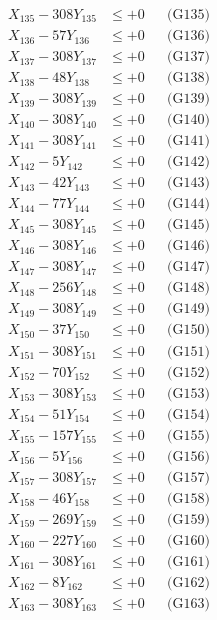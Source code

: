 \documentclass[a4paper,10pt]{article}
\begin{document}
{\begin{align}
X_{135} - 308Y_{135} &\leq +0 && \text{(G135)} \\
X_{136} - 57Y_{136} &\leq +0 && \text{(G136)} \\
X_{137} - 308Y_{137} &\leq +0 && \text{(G137)} \\
X_{138} - 48Y_{138} &\leq +0 && \text{(G138)} \\
X_{139} - 308Y_{139} &\leq +0 && \text{(G139)} \\
X_{140} - 308Y_{140} &\leq +0 && \text{(G140)} \\
\allowbreak
X_{141} - 308Y_{141} &\leq +0 && \text{(G141)} \\
X_{142} - 5Y_{142} &\leq +0 && \text{(G142)} \\
X_{143} - 42Y_{143} &\leq +0 && \text{(G143)} \\
X_{144} - 77Y_{144} &\leq +0 && \text{(G144)} \\
X_{145} - 308Y_{145} &\leq +0 && \text{(G145)} \\
X_{146} - 308Y_{146} &\leq +0 && \text{(G146)} \\
X_{147} - 308Y_{147} &\leq +0 && \text{(G147)} \\
X_{148} - 256Y_{148} &\leq +0 && \text{(G148)} \\
X_{149} - 308Y_{149} &\leq +0 && \text{(G149)} \\
X_{150} - 37Y_{150} &\leq +0 && \text{(G150)} \\
\allowbreak
X_{151} - 308Y_{151} &\leq +0 && \text{(G151)} \\
X_{152} - 70Y_{152} &\leq +0 && \text{(G152)} \\
X_{153} - 308Y_{153} &\leq +0 && \text{(G153)} \\
X_{154} - 51Y_{154} &\leq +0 && \text{(G154)} \\
X_{155} - 157Y_{155} &\leq +0 && \text{(G155)} \\
X_{156} - 5Y_{156} &\leq +0 && \text{(G156)} \\
X_{157} - 308Y_{157} &\leq +0 && \text{(G157)} \\
X_{158} - 46Y_{158} &\leq +0 && \text{(G158)} \\
X_{159} - 269Y_{159} &\leq +0 && \text{(G159)} \\
X_{160} - 227Y_{160} &\leq +0 && \text{(G160)} \\
\allowbreak
X_{161} - 308Y_{161} &\leq +0 && \text{(G161)} \\
X_{162} - 8Y_{162} &\leq +0 && \text{(G162)} \\
X_{163} - 308Y_{163} &\leq +0 && \text{(G163)} \\

\end{align}}
\end{document}
